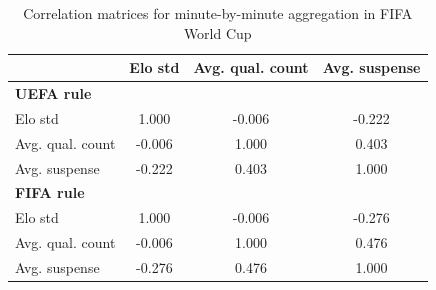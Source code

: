 \begin{table}[H]
\centering
\small
\caption{Correlation matrices for minute-by-minute aggregation in FIFA World Cup}
\label{tab:corr_wc_mbm}
\begin{tabular}{lccc}
\toprule
 & Elo std & Avg. qual. count & Avg. suspense \\
\midrule
\multicolumn{4}{l}{\textbf{UEFA rule}} \\
Elo std             & 1.000 & -0.006 & -0.222 \\
Avg. qual. count    & -0.006 & 1.000 & 0.403 \\
Avg. suspense       & -0.222 & 0.403 & 1.000 \\
\midrule
\multicolumn{4}{l}{\textbf{FIFA rule}} \\
Elo std             & 1.000 & -0.006 & -0.276 \\
Avg. qual. count    & -0.006 & 1.000 & 0.476 \\
Avg. suspense       & -0.276 & 0.476 & 1.000 \\
\bottomrule
\end{tabular}
\end{table}

